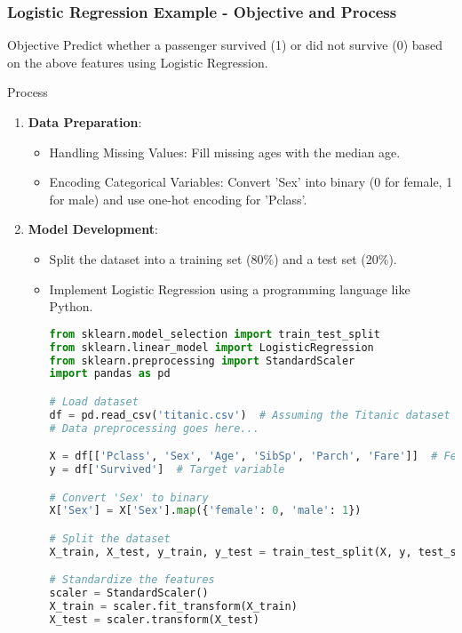 \documentclass[aspectratio=169]{beamer}
\begin{document}
\begin{frame}[fragile]
    \frametitle{Logistic Regression Example - Objective and Process}
    \begin{block}{Objective}
        Predict whether a passenger survived (1) or did not survive (0) based on the above features using Logistic Regression.
    \end{block}

    \begin{block}{Process}
        \begin{enumerate}
            \item \textbf{Data Preparation}:
            \begin{itemize}
                \item Handling Missing Values: Fill missing ages with the median age.
                \item Encoding Categorical Variables: Convert 'Sex' into binary (0 for female, 1 for male) and use one-hot encoding for 'Pclass'.
            \end{itemize}

            \item \textbf{Model Development}:
            \begin{itemize}
                \item Split the dataset into a training set (80\%) and a test set (20\%).
                \item Implement Logistic Regression using a programming language like Python.
                \begin{lstlisting}[language=Python]
from sklearn.model_selection import train_test_split
from sklearn.linear_model import LogisticRegression
from sklearn.preprocessing import StandardScaler
import pandas as pd

# Load dataset
df = pd.read_csv('titanic.csv')  # Assuming the Titanic dataset is in CSV format
# Data preprocessing goes here...

X = df[['Pclass', 'Sex', 'Age', 'SibSp', 'Parch', 'Fare']]  # Feature set
y = df['Survived']  # Target variable

# Convert 'Sex' to binary
X['Sex'] = X['Sex'].map({'female': 0, 'male': 1})

# Split the dataset
X_train, X_test, y_train, y_test = train_test_split(X, y, test_size=0.2, random_state=42)

# Standardize the features
scaler = StandardScaler()
X_train = scaler.fit_transform(X_train)
X_test = scaler.transform(X_test)


\end{lstlisting}
\end{itemize}
\end{enumerate}
\end{block}
\end{frame}
\end{document}
